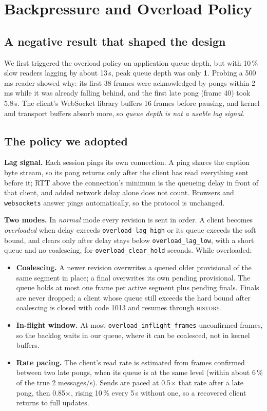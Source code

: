 \documentclass[11pt,a4paper]{article}
\begin{document}
\section{Backpressure and Overload Policy}

\subsection{A negative result that shaped the design}

We first triggered the overload policy on application queue depth, but with
10\,\% slow readers lagging by about 13\,s, peak queue depth was only
\textbf{1}. Probing a 500\,ms reader showed why: its first 38 frames were
acknowledged by pongs within 2\,ms while it was already falling behind, and
the first late pong (frame 40) took 5.8\,s. The client's WebSocket library
buffers 16 frames before pausing, and kernel and transport buffers absorb
more, so \emph{queue depth is not a usable lag signal}.

\subsection{The policy we adopted}

\textbf{Lag signal.} Each session pings its own connection. A ping shares the
caption byte stream, so its pong returns only after the client has read
everything sent before it; RTT above the connection's minimum is the queueing
delay in front of that client, and added network delay alone does not count.
Browsers and \texttt{websockets} answer pings automatically, so the protocol
is unchanged.

\textbf{Two modes.} In \emph{normal} mode every revision is sent in order. A
client becomes \emph{overloaded} when delay exceeds
\texttt{overload\_lag\_high} or its queue exceeds the soft bound, and clears
only after delay stays below \texttt{overload\_lag\_low}, with a short queue
and no coalescing, for \texttt{overload\_clear\_hold} seconds. While
overloaded:

\begin{itemize}
\item \textbf{Coalescing.} A newer revision overwrites a queued older
      provisional of the same segment in place; a final overwrites its own
      pending provisional. The queue holds at most one frame per active
      segment plus pending finals. Finals are never dropped; a client whose
      queue still exceeds the hard bound after coalescing is closed with code
      1013 and resumes through \textsc{history}.
\item \textbf{In-flight window.} At most \texttt{overload\_inflight\_frames}
      unconfirmed frames, so the backlog waits in our queue, where it can be
      coalesced, not in kernel buffers.
\item \textbf{Rate pacing.} The client's read rate is estimated from frames
      confirmed between two late pongs, when its queue is at the same level
      (within about 6\,\% of the true 2 messages/s). Sends are paced at
      0.5$\times$ that rate after a late pong, then 0.85$\times$, rising
      10\,\% every 5\,s without one, so a recovered client returns to full
      updates.
\end{itemize}
\end{document}
